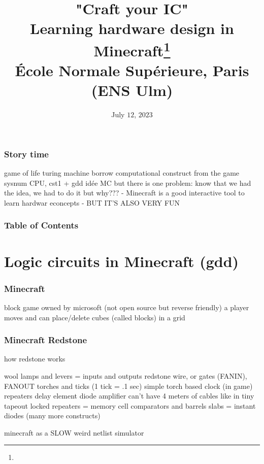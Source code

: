 \documentclass[aspectratio=169]{beamer}
\title{"Craft your IC"\\Learning hardware design in
Minecraft\footnote{\tiny{}\reproduce}\\\small{} École Normale Supérieure, Paris (ENS Ulm)}
\author{\names}
\institute{FSiC $2023$}
\date{July $12$, $2023$}
\begin{document}
\beamertemplatenavigationsymbolsempty
{}

\maketitle

\begin{frame}[fragile]
	\frametitle{Story time}
	game of life turing machine
	borrow computational construct from the game
	sysnum CPU, cst1 + gdd idée MC
	but there is one problem: know that we had the idea, we had to do it
	but why???
	- Minecraft is a good interactive tool to learn hardwar econcepts
	- BUT IT'S ALSO VERY FUN
\end{frame}

\begin{frame}[fragile]
	\frametitle{Table of Contents}
	\tableofcontents
\end{frame}

\section{Logic circuits in Minecraft (gdd)}

\begin{frame}
	\frametitle{Minecraft}
	block game owned by microsoft (not open source but reverse friendly)
	a player moves and can place/delete cubes (called blocks) in a grid
\end{frame}

\begin{frame}
	\frametitle{Minecraft Redstone}
	how redstone works

	wool
	lamps and levers = inputs and outputs
	redstone wire, or gates (FANIN), FANOUT
	torches and ticks (1 tick = .1 sec)
	simple torch based clock (in game)
	repeaters
	delay element
	diode
	amplifier
	can't have 4 meters of cables like in tiny tapeout
	locked repeaters = memory cell
	comparators and barrels
	slabs = instant diodes
	(many more constructs)

	minecraft as a SLOW weird netlist simulator
\end{frame}
\end{document}
